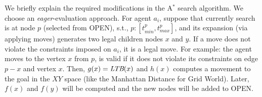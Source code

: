 \documentclass{article}
\begin{document}
{We briefly explain the required modifications in the A$^*$ search algorithm. We choose an \emph{eager}-evaluation approach. For agent $a_i$, suppose that currently search is at node $p$ (selected from OPEN), s.t., $p:[t_{min}^p,t_{max}^p]$, and its expansion (via applying moves) generates two legal children nodes $x$ and $y$. 
If a move does not violate the constraints imposed on $a_i$, it is a legal move. For example: the agent moves to the vertex $x$ from $p$, is valid if it does not violate its constraints on edge $p-x$ and vertex $x$. 
%
%
Then, $g(x)=\emph{LTB}(x)$ and $h(x)$ computes a movement to the goal in the $XY$ space (like the Manhattan Distance for Grid World). Later, $f(x)$ and $f(y)$ will be computed and the new nodes will be added to OPEN. 


}
\end{document}
